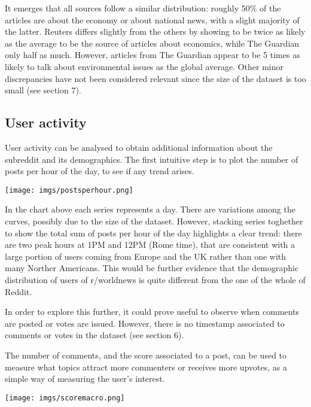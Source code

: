 \documentclass{article}
\begin{document}
It emerges that all sources follow a similar distribution: roughly 50\% of the articles are about the economy or about national news, with a slight majority of the latter. Reuters differs slightly from the others by showing to be twice as likely as the average to be the source of articles about economics, while The Guardian only half as much. However, articles from The Guardian appear to be 5 times as likely to talk about environmental issues as the global average. Other minor discrepancies have not been considered relevant since the size of the dataset is too small (see section 7).

\pagebreak
\subsection{User activity}
User activity can be analysed to obtain additional information about the subreddit and its demographics. The first intuitive step is to plot the number of posts per hour of the day, to see if any trend arises.

\bigskip

\texttt{[image: imgs/postsperhour.png]}

\bigskip

In the chart above each series represents a day. There are variations among the curves, possibly due to the size of the dataset. However, stacking series toghether to show the total sum of posts per hour of the day highlights a clear trend: there are two peak hours at 1PM and 12PM (Rome time), that are consistent with a large portion of users coming from Europe and the UK rather than one with many Norther Americans. This would be further evidence that the demographic distribution of users of r/worldnews is quite different from the one of the whole of Reddit.

In order to explore this further, it could prove useful to observe when comments are posted or votes are issued. However, there is no timestamp associated to comments or votes in the dataset (see section 6).

The number of comments, and the score associated to a post, can be used to measure what topics attract more commenters or receives more upvotes, as a simple way of measuring the user's interest.

\bigskip

\texttt{[image: imgs/scoremacro.png]}

\bigskip
\end{document}
